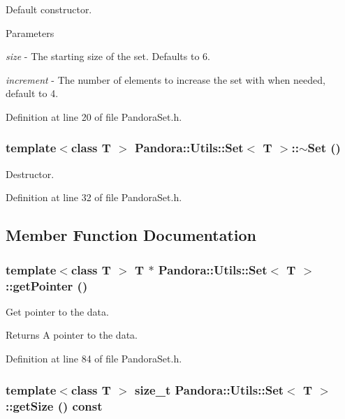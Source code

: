 Default constructor. 
\begin{DoxyParams}{Parameters}
\item[{\em size}]-\/ The starting size of the set. Defaults to 6. \item[{\em increment}]-\/ The number of elements to increase the set with when needed, default to 4. \end{DoxyParams}


Definition at line 20 of file PandoraSet.h.\hypertarget{classPandora_1_1Utils_1_1Set_a51d05d5d31cb8c16b510262737969f0e}{
\subsubsection[{$\sim$Set}]{\setlength{\rightskip}{0pt plus 5cm}template$<$class T $>$ {\bf Pandora::Utils::Set}$<$ T $>$::$\sim${\bf Set} ()}}
\label{classPandora_1_1Utils_1_1Set_a51d05d5d31cb8c16b510262737969f0e}


Destructor. 

Definition at line 32 of file PandoraSet.h.

\subsection{Member Function Documentation}
\hypertarget{classPandora_1_1Utils_1_1Set_a57d191182540ce79e9a0db1cf52ddd10}{
\subsubsection[{getPointer}]{\setlength{\rightskip}{0pt plus 5cm}template$<$class T $>$ T $\ast$ {\bf Pandora::Utils::Set}$<$ T $>$::getPointer ()}}
\label{classPandora_1_1Utils_1_1Set_a57d191182540ce79e9a0db1cf52ddd10}


Get pointer to the data. \begin{DoxyReturn}{Returns}
A pointer to the data. 
\end{DoxyReturn}


Definition at line 84 of file PandoraSet.h.\hypertarget{classPandora_1_1Utils_1_1Set_a80998fcb33af9bcd8ef6549f107ee1f6}{
\subsubsection[{getSize}]{\setlength{\rightskip}{0pt plus 5cm}template$<$class T $>$ size\_\-t {\bf Pandora::Utils::Set}$<$ T $>$::getSize () const}}
\label{classPandora_1_1Utils_1_1Set_a80998fcb33af9bcd8ef6549f107ee1f6}


